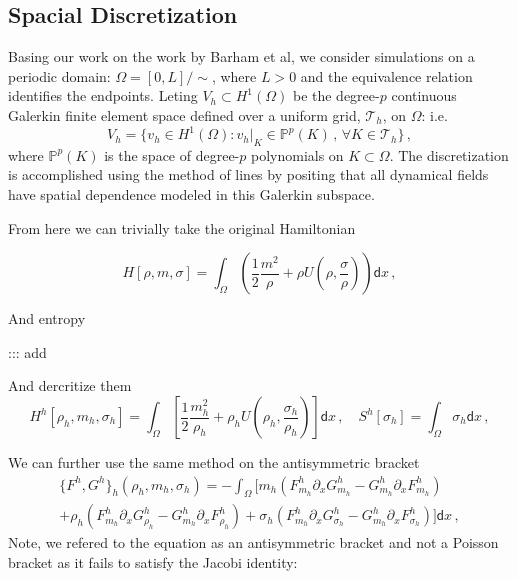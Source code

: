 \subsection{Spacial Discretization}

Basing our work on the work by Barham et al, we consider simulations on a periodic domain: $\Omega = [0,L]/\sim$, where $L > 0$ and the equivalence relation identifies the endpoints. Leting $V_h \subset H^1(\Omega)$ be the degree-$p$ continuous Galerkin finite element space defined over a uniform grid, $\mathcal{T}_h$, on $\Omega$: i.e.
\begin{equation}
    V_h
    =
    \{ v_h \in H^1(\Omega) : \left. v_h \right|_{K} \in \mathbb{P}^p(K) \,,\, \forall K \in \mathcal{T}_h \} \,,
\end{equation}
where $\mathbb{P}^p(K)$ is the space of degree-$p$ polynomials on $K \subset \Omega$. The discretization is accomplished using the method of lines by positing that all dynamical fields have spatial dependence modeled in this Galerkin subspace.


From here we can trivially take the original Hamiltonian

\begin{equation}
    H[\rho, m, \sigma]
    =
    \int_\Omega
    \left(
    \frac{1}{2} \frac{m^2}{\rho}
    +
    \rho U \left(\rho, \frac{\sigma}{\rho} \right)
    \right)
    \mathsf{d} x \,,
\end{equation}

And entropy

::: add

And dercritize them
\begin{equation}
    H^h[\rho_h, m_h, \sigma_h]
    =
    \int_\Omega
    \left[
    \frac{1}{2} \frac{m_h^2}{\rho_h}
    +
    \rho_h U \left(\rho_h, \frac{\sigma_h}{\rho_h} \right)
    \right]
    \mathsf{d} x \,,
    \quad
    S^h[\sigma_h]
    =
    \int_\Omega \sigma_h \mathsf{d} x \,,
\end{equation}

We can further use the same method on the antisymmetric bracket
\begin{multline} \label{eq:discrete_poisson_bracket}
    \{F^h, G^h\}_h(\rho_h, m_h, \sigma_h)
    =
    - \int_\Omega
    \bigg[
    m_h \left(
    F^h_{m_h} \partial_x G^h_{m_h}
    -
    G^h_{m_h} \partial_x F^h_{m_h}
    \right) \\
    +
    \rho_h \left(
    F^h_{m_h} \partial_x G^h_{\rho_h}
    -
    G^h_{m_h} \partial_x F^h_{\rho_h}
    \right)
    +
    \sigma_h \left(
    F^h_{m_h} \partial_x G^h_{\sigma_h}
    -
    G^h_{m_h} \partial_x F^h_{\sigma_h}
    \right)
    \bigg]
    \mathsf{d} x \,,
\end{multline}
Note, we refered to the equation as an antisymmetric bracket and not a Poisson bracket as it fails to satisfy the Jacobi identity:

